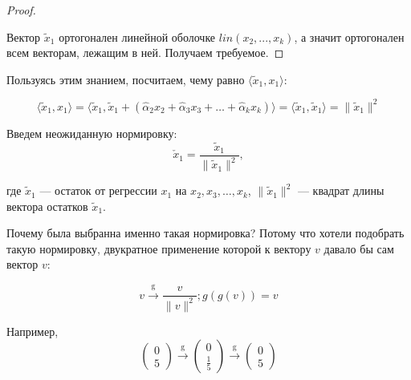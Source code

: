 \documentclass[12pt]{article} %
\theoremstyle{definition} %
\begin{document}
\begin{proof}
\begin{center}



\end{center}

Вектор $\tilde x_1$ ортогонален линейной оболочке $lin \left(x_2, ..., x_k \right)$, а значит ортогонален всем векторам, лежащим в ней. Получаем требуемое.



\end{proof}

Пользуясь этим знанием, посчитаем, чему равно $\langle \tilde x_1, x_1 \rangle$:

\[
\langle \tilde x_1, x_1 \rangle = \langle \tilde x_1, \tilde x_1 + \left(\hat \alpha_2 x_2 + \hat \alpha_3 x_3 + \ldots + \hat \alpha_k x_k \right) \rangle = \langle \tilde x_1, \tilde x_1 \rangle = \| \tilde x_1 \|^2
\]

Введем неожиданную нормировку:
\[
\check x_1 = \frac{\tilde x_1}{\| \tilde x_1 \|^2},
\]

где $\tilde x_1$ — остаток от регрессии $x_1$ на $x_2, x_3, \dots, x_k$, $\| \tilde x_1 \|^2$ — квадрат длины вектора остатков $\tilde x_1$.


Почему была выбранна именно такая нормировка? Потому что хотели подобрать такую нормировку, двукратное применение которой к вектору $v$ давало бы сам вектор $v$:

\[
v \xrightarrow{\text{g}} \frac{v}{\| v \|^2};
g \left(g \left(v \right) \right) = v
\]

Например,
\[
\begin{pmatrix} 0 \\ 5 \end{pmatrix} \xrightarrow{\text{g}} \begin{pmatrix} 0 \\ \frac{1}{5} \end{pmatrix} \xrightarrow{\text{g}} \begin{pmatrix} 0 \\ 5 \end{pmatrix}
\]
\end{document}
